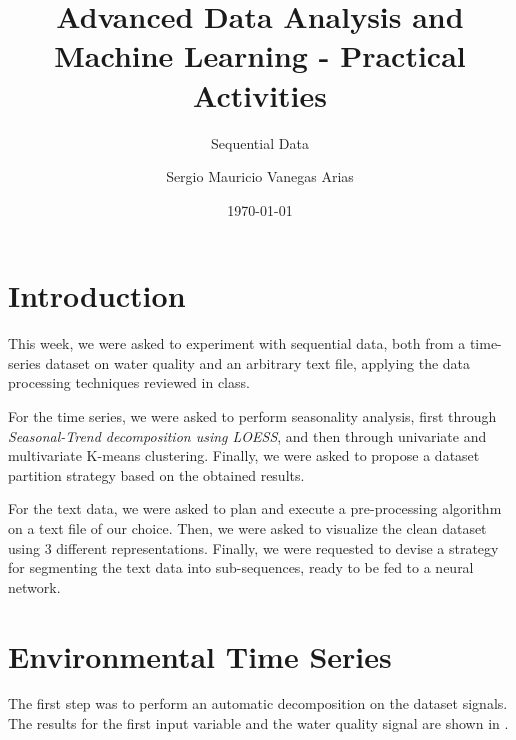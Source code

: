 \documentclass{scrartcl}
\title{Advanced Data Analysis and Machine Learning - Practical Activities}
\subtitle{Sequential Data}
\author{Sergio Mauricio Vanegas Arias}
\date{\today}
\begin{document}
\maketitle

\section{Introduction}

  This week, we were asked to experiment with sequential data, both from a time-series dataset on water quality and an arbitrary text file, applying the data processing techniques reviewed in class.

  For the time series, we were asked to perform seasonality analysis, first through \textit{Seasonal-Trend decomposition using LOESS}, and then through univariate and multivariate K-means clustering. Finally, we were asked to propose a dataset partition strategy based on the obtained results.

  For the text data, we were asked to plan and execute a pre-processing algorithm on a text file of our choice. Then, we were asked to visualize the clean dataset using 3 different representations. Finally, we were requested to devise a strategy for segmenting the text data into sub-sequences, ready
  to be fed to a neural network.

\section{Environmental Time Series}

  The first step was to perform an automatic decomposition on the dataset signals. The results for the first input variable and the water quality signal are shown in .
\end{document}
